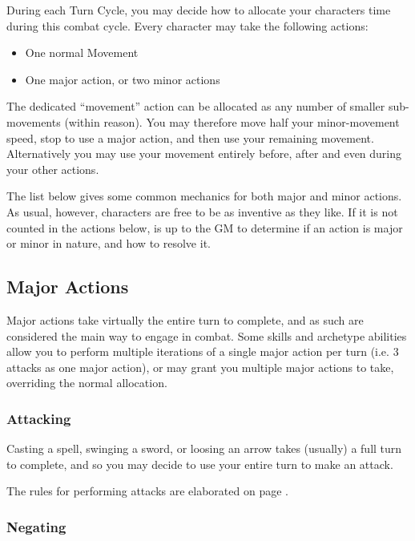  During each Turn Cycle, you may decide how to allocate your character\apos{}s time during this combat cycle. Every character may take the following actions: 
 
 \begin{itemize}
	\item One normal Movement
	\item One major action, or two minor actions
 \end{itemize}
 
 The dedicated ``movement'' action can be allocated as any number of smaller sub-movements (within reason). You may therefore move half your minor-movement speed, stop to use a major action, and then use your remaining movement. Alternatively you may use your movement entirely before, after and even during your other actions.  
 
 The list below gives some common mechanics for both major and minor actions. As usual, however, characters are free to be as inventive as they like. If it is not counted in the actions below, is up to the GM to determine if an action is major or minor in nature, and how to resolve it. 
 
 \subsection{Major Actions}
 
 Major actions take virtually the entire turn to complete, and as such are considered the main way to engage in combat. Some skills and archetype abilities allow you to perform multiple iterations of a single major action per turn (i.e. 3 attacks as one major action), or may grant you multiple major actions to take, overriding the normal allocation. 
 
 \subsubsection{Attacking}
 
 Casting a spell, swinging a sword, or loosing an arrow takes (usually) a full turn to complete, and so you may decide to use your entire turn to make an attack.
 
The rules for performing attacks are elaborated on page \pageref{S:Attacks}.


	\subsubsection{Negating}
	
